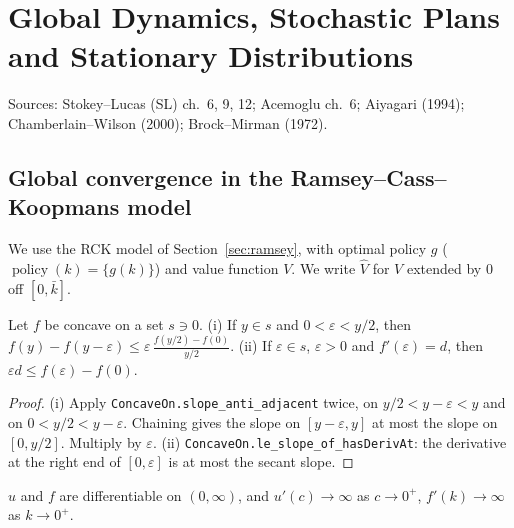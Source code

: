 \chapter{Global Dynamics, Stochastic Plans and Stationary Distributions}
\label{chap:stochastic_ha}

Sources: Stokey--Lucas (SL) ch.~6, 9, 12; Acemoglu ch.~6; Aiyagari (1994); Chamberlain--Wilson (2000);
Brock--Mirman (1972).

\section{Global convergence in the Ramsey--Cass--Koopmans model}
\label{sec:ramsey_global}

We use the RCK model of Section~\ref{sec:ramsey}, with optimal policy $g$
($\operatorname{policy}(k) = \{g(k)\}$) and value function $V$. We write $\hat V$ for $V$
extended by $0$ off $[0,\bar k]$.

\begin{lemma}
\label{lem:concave_secant_bounds}
\leanok
Let $f$ be concave on a set $s \ni 0$.
(i) If $y \in s$ and $0 < \varepsilon < y/2$, then $f(y) - f(y - \varepsilon) \le \varepsilon\,
\frac{f(y/2) - f(0)}{y/2}$.
(ii) If $\varepsilon \in s$, $\varepsilon > 0$ and $f'(\varepsilon) = d$, then $\varepsilon d \le f(\varepsilon) - f(0)$.
\end{lemma}
\begin{proof}
\leanok
(i) Apply \texttt{ConcaveOn.slope\_anti\_adjacent} twice, on $y/2 < y - \varepsilon < y$ and on
$0 < y/2 < y - \varepsilon$. Chaining gives the slope on $[y-\varepsilon, y]$ at most the slope on $[0, y/2]$.
Multiply by $\varepsilon$.
(ii) \texttt{ConcaveOn.le\_slope\_of\_hasDerivAt}: the derivative at the right end of $[0,\varepsilon]$ is at most
the secant slope.
\end{proof}

\begin{definition}
\label{def:rck_inada}
\leanok
{}
$u$ and $f$ are differentiable on $(0,\infty)$, and $u'(c) \to \infty$ as $c \to 0^+$, $f'(k) \to \infty$ as $k \to 0^+$.
\end{definition}


